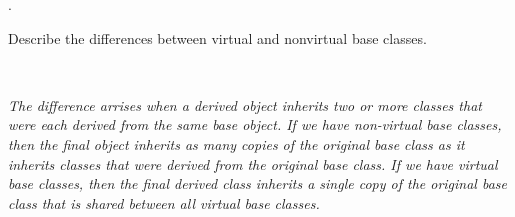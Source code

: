 \documentclass{amsart}
\begin{document}
. 
\begin{minipage}[t]{11.5 cm}
	Describe the differences between virtual and nonvirtual base classes.
\end{minipage} \\[1ex]
\phantom{3. } 
\begin{minipage}[t]{11.5 cm}
	{\slshape 
		The difference arrises when a derived object inherits two 
		or more classes that were each derived from the same base 
		object.
		If we have non-virtual base classes, then the final object
		inherits as many copies of the original base class as it inherits 
		classes that were derived from the original base class.
		If we have virtual base classes, then the final derived
		class inherits a single copy of the original base class that
		is shared between all virtual base classes.
	}
\end{minipage} 
\vfill
\end{document}

